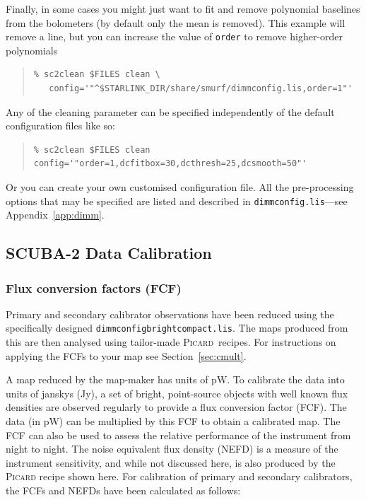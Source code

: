 \documentclass[twoside,11pt]{article}
\newcommand{\htmlref}[2]{#1}
\newcommand{\latexhtml}[2]{#1}
\newcommand{\xref}[3]{#1}
\newcommand{\xlabel}[1]{}
\renewcommand{\_}{\texttt{\symbol{95}}}
\newenvironment{myquote}{\begin{quote}\begin{small}}{\end{small}\end{quote}}
\newcommand{\picard}{\xref{\textsc{Picard}}{sun265}{}}
\newcommand{\cref}[3]{\latexhtml{#1~\ref{#2}}{\htmlref{#3}{#2}}}
\begin{document}
Finally, in some cases you might just want to fit and remove
polynomial baselines from the bolometers (by default only the mean is
removed). This example will remove a line, but you can increase the
value of \texttt{order} to remove higher-order polynomials

\begin{myquote}
\begin{verbatim}
% sc2clean $FILES clean \
   config='"^$STARLINK_DIR/share/smurf/dimmconfig.lis,order=1"'
\end{verbatim}
\end{myquote}

Any of the cleaning parameter can be specified independently of the
default configuration files like so:
\begin{myquote}
\begin{verbatim}
% sc2clean $FILES clean config='"order=1,dcfitbox=30,dcthresh=25,dcsmooth=50"'
\end{verbatim}
\end{myquote}
Or you can create your own customised configuration file. All the
pre-processing options that may be specified are listed and described
in \texttt{dimmconfig.lis}---see \cref{Appendix}{app:dimm}{here}.


\newpage
\subsection{\xlabel{calib}SCUBA-2 Data Calibration}
\label{app:cal}

\subsubsection{\xlabel{fcf}Flux conversion factors (FCF)}
\label{app:fcf}

Primary and secondary calibrator observations have been reduced using
the specifically designed \texttt{dimmconfig\_bright\_compact.lis}.
The maps produced from this are then analysed using tailor-made
\picard\ recipes. For instructions on applying the FCFs to your map see
\cref{Section}{sec:cmult}{this page}.

A map reduced by the map-maker has units of pW. To calibrate the data
into units of janskys (Jy), a set of bright, point-source objects with
well known flux densities are observed regularly to provide a flux
conversion factor (FCF). The data (in pW) can be multiplied by this FCF
to obtain a calibrated map. The FCF can also be used to assess the
relative performance of the instrument from night to night. The noise
equivalent flux density (NEFD) is a measure of the instrument
sensitivity, and while not discussed here, is also produced by the
\textsc{Picard} recipe shown here. For calibration of primary and secondary
calibrators, the FCFs and NEFDs have been calculated as follows:
\end{document}
